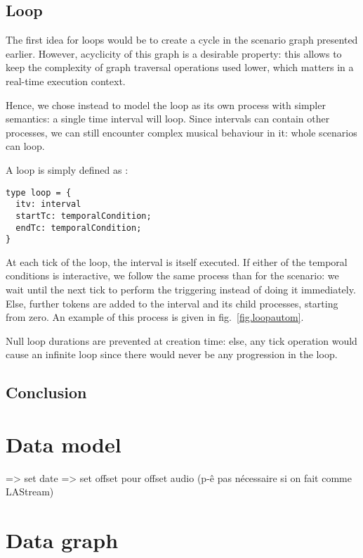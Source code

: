 \documentclass[applsci,article,submit,moreauthors,pdftex,10pt,a4paper]{mdpi}
\begin{document}
\subsection{Loop}\label{sec.loop}
The first idea for loops would be to create a cycle in the scenario graph presented earlier.
However, acyclicity of this graph is a desirable property: this allows to keep the complexity of graph traversal operations used lower,
which matters in a real-time execution context.

Hence, we chose instead to model the loop as its own process with simpler semantics: 
a single time interval will loop. Since intervals can contain other processes, we can still encounter complex musical behaviour in it:
whole scenarios can loop.

A loop is simply defined as : 
\begin{lstlisting}
type loop = {
  itv: interval
  startTc: temporalCondition; 
  endTc: temporalCondition;
}
\end{lstlisting}

At each tick of the loop, the interval is itself executed.
If either of the temporal conditions is interactive, we follow the same process than for the scenario: 
we wait until the next tick to perform the triggering instead of doing it immediately. 
Else, further tokens are added to the interval and its child processes, starting from zero.
An example of this process is given in fig.~\ref{fig.loopautom}.

Null loop durations are prevented at creation time: else, any tick operation would cause an infinite loop since there 
would never be any progression in the loop.

\subsection{Conclusion}

\section{Data model}\label{sec.datamodel}
=> set date
=> set offset pour offset audio (p-ê pas nécessaire si on fait comme LAStream)

\section{Data graph}
\end{document}
